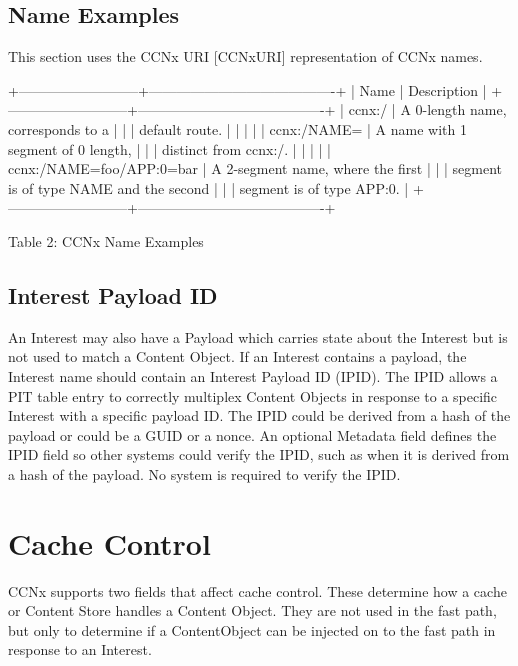 \documentclass[12pt]{article}
\begin{document}
\subsection{Name Examples}
This section uses the CCNx URI [CCNxURI] representation of CCNx names.

+--------------------------+----------------------------------------+
|           Name           | Description                            |
+--------------------------+----------------------------------------+
|          ccnx:/          | A 0-length name, corresponds to a      |
|                          | default route.                         |
|                          |                                        |
|       ccnx:/NAME=        | A name with 1 segment of 0 length,     |
|                          | distinct from ccnx:/.                  |
|                          |                                        |
| ccnx:/NAME=foo/APP:0=bar | A 2-segment name, where the first      |
|                          | segment is of type NAME and the second |
|                          | segment is of type APP:0.              |
+--------------------------+----------------------------------------+

                     Table 2: CCNx Name Examples

\subsection{Interest Payload ID}
An Interest may also have a Payload which carries state about the
Interest but is not used to match a Content Object.  If an Interest
contains a payload, the Interest name should contain an Interest
Payload ID (IPID).  The IPID allows a PIT table entry to correctly
multiplex Content Objects in response to a specific Interest with a
specific payload ID.  The IPID could be derived from a hash of the
payload or could be a GUID or a nonce.  An optional Metadata field
defines the IPID field so other systems could verify the IPID, such
as when it is derived from a hash of the payload.  No system is
required to verify the IPID.

\section{Cache Control}
CCNx supports two fields that affect cache control.  These determine
how a cache or Content Store handles a Content Object.  They are not
used in the fast path, but only to determine if a ContentObject can
be injected on to the fast path in response to an Interest.
\end{document}
